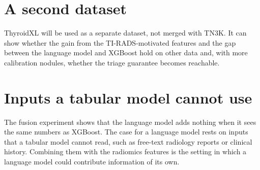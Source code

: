 \section{A second dataset}

ThyroidXL will be used as a separate dataset, not merged with TN3K. It can show whether the gain
from the TI-RADS-motivated features and the gap between the language model and XGBoost hold on
other data and, with more calibration nodules, whether the triage guarantee becomes reachable.

\section{Inputs a tabular model cannot use}

The fusion experiment shows that the language model adds nothing when it sees the same numbers as
XGBoost. The case for a language model rests on inputs that a tabular model cannot read, such as
free-text radiology reports or clinical history. Combining them with the radiomics features is the
setting in which a language model could contribute information of its own.
